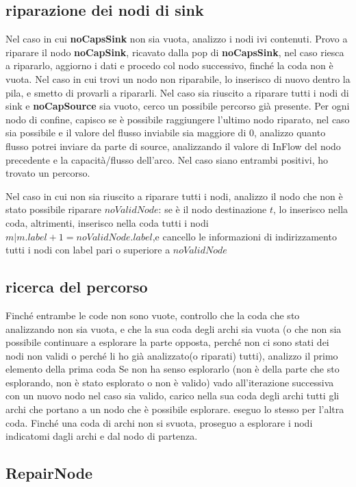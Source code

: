 \documentclass{article}
\begin{document}
\subsection{riparazione dei nodi di sink}
Nel caso in cui \textbf{noCapsSink} non sia vuota, analizzo i nodi ivi contenuti.
Provo a riparare il nodo \textbf{noCapSink}, ricavato dalla pop di \textbf{noCapsSink},
nel caso riesca a ripararlo, aggiorno i dati e procedo col nodo successivo, finché la coda non è vuota.
Nel caso in cui trovi un nodo non riparabile, lo inserisco di nuovo dentro la pila, e smetto di provarli a ripararli.
Nel caso sia riuscito a riparare tutti i nodi di sink e \textbf{noCapSource} sia vuoto, cerco un possibile percorso già presente.
Per ogni nodo di confine, capisco se è possibile raggiungere l'ultimo nodo riparato, nel caso sia possibile
e il valore del flusso inviabile sia maggiore di 0,
analizzo quanto flusso potrei inviare da parte di source,
analizzando il valore di InFlow del nodo precedente e
la capacità/flusso dell'arco.
Nel caso siano entrambi positivi, ho trovato un percorso.

Nel caso in cui non sia riuscito a riparare tutti i nodi, analizzo il nodo che non è stato possibile riparare $noValidNode$:
se è il nodo destinazione $t$, lo inserisco nella coda, altrimenti, inserisco nella coda tutti i nodi $m | m.label +1 = noValidNode.label$,e cancello le informazioni di indirizzamento tutti i nodi con label pari o superiore a $noValidNode$

\subsection{ricerca del percorso}

Finché entrambe le code non sono vuote,
controllo che la coda che sto analizzando non sia vuota, e che la sua coda degli archi sia vuota (o che non sia possibile continuare a esplorare la parte opposta, perché non ci sono stati dei nodi non validi o perché li ho già analizzato(o riparati) tutti),
analizzo il primo elemento della prima coda
Se non ha senso esplorarlo (non è della parte che sto esplorando, non è stato esplorato o non è valido)
vado all'iterazione successiva con un nuovo nodo
nel caso sia valido, carico nella sua coda degli archi tutti gli archi che portano a un nodo che è possibile esplorare.
eseguo lo stesso per l'altra coda.
Finché una coda di archi non si svuota, proseguo a esplorare i nodi indicatomi dagli archi e dal nodo di partenza.

\subsection{RepairNode}
\end{document}
